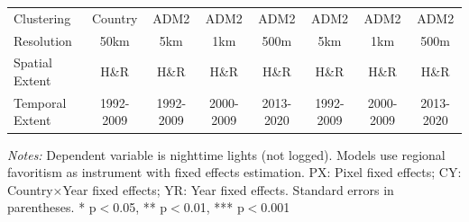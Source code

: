 \begin{table}[htbp]
\begin{tabular}{lccccccc}
Clustering & Country & ADM2 & ADM2 & ADM2 & ADM2 & ADM2 & ADM2 \\
Resolution & 50km & 5km & 1km & 500m & 5km & 1km & 500m \\
Spatial Extent & H\&R & H\&R & H\&R & H\&R & H\&R & H\&R & H\&R \\
Temporal Extent & 1992-2009 & 1992-2009 & 2000-2009 & 2013-2020 & 1992-2009 & 2000-2009 & 2013-2020 \\
\bottomrule
\end{tabular}
\begin{threeparttable}
\begin{tablenotes}\small
\item \textit{Notes:} Dependent variable is nighttime lights (not logged). Models use regional favoritism as instrument with  fixed effects estimation. PX: Pixel fixed effects; CY: Country×Year fixed effects; YR: Year fixed effects. Standard errors in parentheses. * p$<$0.05, ** p$<$0.01, *** p$<$0.001
\end{tablenotes}
\end{threeparttable}
\end{table}